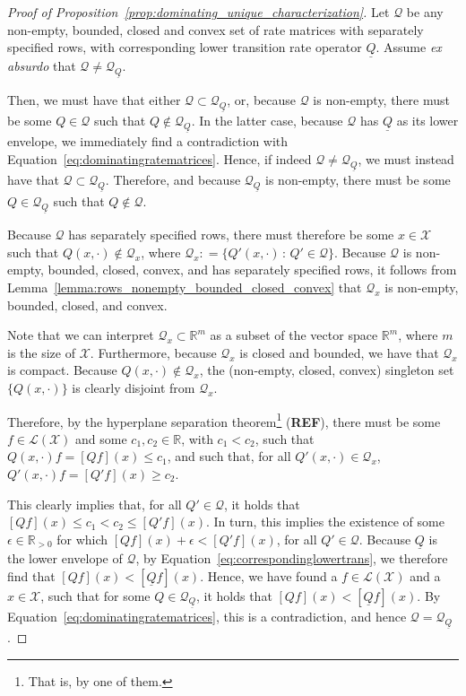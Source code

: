 \documentclass[10pt]{paper}
\theoremstyle{definition}
\newcommand{\reals}{\mathbb{R}}
\newcommand{\realspos}{\reals_{>0}}
\newcommand{\states}{\mathcal{X}}
\newcommand{\gambles}{\mathcal{L}}
\newcommand{\gamblesX}{\gambles(\states)}
\newcommand{\rateset}{\mathcal{Q}}
\newcommand{\lrate}{\underline{Q}}
\newcommand{\coloneqq}{:\!=}
\begin{document}
\begin{proof}[Proof of Proposition~\ref{prop:dominating_unique_characterization}]
Let $\rateset$ be any non-empty, bounded, closed and convex set of rate matrices with separately specified rows, with corresponding lower transition rate operator $\lrate$. Assume \emph{ex absurdo} that $\rateset\neq\rateset_{\lrate}$.

Then, we must have that either $\rateset\subset\rateset_{\lrate}$, or, because $\rateset$ is non-empty, there must be some $Q\in\rateset$ such that $Q\notin\rateset_{\lrate}$. In the latter case, because $\rateset$ has $\lrate$ as its lower envelope, we immediately find a contradiction with Equation~\eqref{eq:dominatingratematrices}. Hence, if indeed $\rateset\neq\rateset_{\lrate}$, we must instead have that $\rateset\subset\rateset_{\lrate}$. Therefore, and because $\rateset_{\lrate}$ is non-empty, there must be some $Q\in\rateset_{\lrate}$ such that $Q\notin\rateset$.

Because $\rateset$ has separately specified rows, there must therefore be some $x\in\states$ such that $Q(x,\cdot)\notin\rateset_x$, where $\rateset_x\coloneqq\{Q'(x,\cdot)\,:\,Q'\in\rateset\}$. Because $\rateset$ is non-empty, bounded, closed, convex, and has separately specified rows, it follows from Lemma~\ref{lemma:rows_nonempty_bounded_closed_convex} that $\rateset_x$ is non-empty, bounded, closed, and convex. 

Note that we can interpret $\rateset_x\subset\reals^m$ as a subset of the vector space $\reals^m$, where $m$ is the size of $\states$. Furthermore, because $\rateset_x$ is closed and bounded, we have that $\rateset_x$ is compact. Because $Q(x,\cdot)\notin\rateset_x$, the (non-empty, closed, convex) singleton set $\{Q(x,\cdot)\}$ is clearly disjoint from $\rateset_x$.

Therefore, by the hyperplane separation theorem\footnote{That is, by one of them.} ({\bf REF}), there must be some $f\in\gamblesX$ and some $c_1,c_2\in\reals$, with $c_1<c_2$, such that $Q(x,\cdot)f = [Qf](x) \leq c_1$, and such that, for all $Q'(x,\cdot)\in\rateset_x$, $Q'(x,\cdot)f = [Q'f](x) \geq c_2$.

This clearly implies that, for all $Q'\in\rateset$, it holds that $[Qf](x) \leq c_1 < c_2 \leq [Q'f](x)$. In turn, this implies the existence of some $\epsilon\in\realspos$ for which $[Qf](x) + \epsilon < [Q'f](x)$, for all $Q'\in\rateset$. Because $\lrate$ is the lower envelope of $\rateset$, by Equation~\eqref{eq:correspondinglowertrans}, we therefore find that $[Qf](x) < [\lrate f](x)$. Hence, we have found a $f\in\gamblesX$ and a $x\in\states$, such that for some $Q\in\rateset_{\lrate}$, it holds that $[Qf](x) < [\lrate f](x)$. By Equation~\eqref{eq:dominatingratematrices}, this is a contradiction, and hence $\rateset=\rateset_{\lrate}$.
\end{proof}
\end{document}
